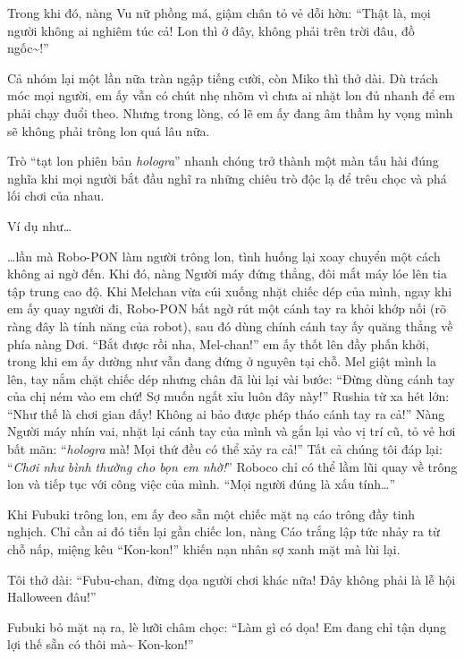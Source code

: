 \documentclass[../main.tex]{subfiles}
\begin{document}
Trong khi đó, nàng Vu nữ phồng má, giậm chân tỏ vẻ dỗi hờn: ``Thật là, mọi người không ai nghiêm túc cả! Lon thì ở đây, không phải trên trời đâu, đồ ngốc\~{}!''

Cả nhóm lại một lần nữa tràn ngập tiếng cười, còn Miko thì thở dài. Dù trách móc mọi người, em ấy vẫn có chút nhẹ nhõm vì chưa ai nhặt lon đủ nhanh để em phải chạy đuổi theo. Nhưng trong lòng, có lẽ em ấy đang âm thầm hy vọng mình sẽ không phải trông lon quá lâu nữa.

\ct

Trò ``tạt lon phiên bản \textit{hologra}'' nhanh chóng trở thành một màn tấu hài đúng nghĩa khi mọi người bắt đầu nghĩ ra những chiêu trò độc lạ để trêu chọc và phá lối chơi của nhau.

Ví dụ như\dots

\il

\dots  lần mà Robo-PON làm người trông lon, tình huống lại xoay chuyển một cách không ai ngờ đến. Khi đó, nàng Người máy đứng thẳng, đôi mắt máy lóe lên tia tập trung cao độ. Khi Melchan vừa cúi xuống nhặt chiếc dép của mình, ngay khi em ấy quay người đi, Robo-PON bất ngờ rút một cánh tay ra khỏi khớp nối (rõ ràng đây là tính năng của robot), sau đó dùng chính cánh tay ấy quăng thẳng về phía nàng Dơi. ``Bắt được rồi nha, Mel-chan!'' em ấy thốt lên đầy phấn khởi, trong khi em ấy dường như vẫn đang đứng ở nguyên tại chỗ. Mel giật mình la lên, tay nắm chặt chiếc dép nhưng chân đã lùi lại vài bước: ``Đừng dùng cánh tay của chị ném vào em chứ! Sợ muốn ngất xỉu luôn đây này!'' Rushia từ xa hét lớn: ``Như thế là chơi gian đấy! Không ai bảo được phép tháo cánh tay ra cả!'' Nàng Người máy nhín vai, nhặt lại cánh tay của mình và gắn lại vào vị trí cũ, tỏ vẻ hơi bất mãn: ``\textit{hologra} mà! Mọi thứ đều có thể xảy ra cả!'' Tất cả chúng tôi đáp lại: ``\textit{Chơi như bình thường cho bọn em nhờ!}'' Roboco chỉ có thể lầm lũi quay về trông lon và tiếp tục với công việc của mình. ``Mọi người đúng là xấu tính\dots''

\ct

Khi Fubuki trông lon, em ấy đeo sẵn một chiếc mặt nạ cáo trông đầy tinh nghịch. Chỉ cần ai đó tiến lại gần chiếc lon, nàng Cáo trắng lập tức nhảy ra từ chỗ nấp, miệng kêu ``Kon-kon!'' khiến nạn nhân sợ xanh mặt mà lùi lại.

Tôi thở dài: ``Fubu-chan, đừng dọa người chơi khác nữa! Đây không phải là lễ hội Halloween đâu!''

Fubuki bỏ mặt nạ ra, lè lưỡi châm chọc: ``Làm gì có dọa! Em đang chỉ tận dụng lợi thế sẵn có thôi mà\~{} Kon-kon!''
\end{document}
